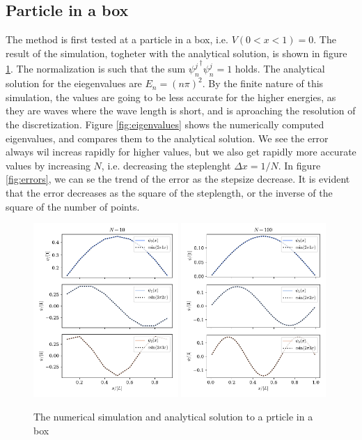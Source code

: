 \documentclass{article}
\begin{document}
\subsection*{Particle in a box}
    The method is first tested at a particle in a box, i.e. $V(0<x<1) = 0$. The result of the simulation, togheter with the analytical solution, is shown in figure \ref{fig:particel in box}. The normalization is such that the sum ${\psi_n^{j}}^\dagger\psi_n^{j} = 1$ holds. The analytical solution for the eiegenvalues are $E_n = (n \pi)^2$. By the finite nature of this simulation, the values are going to be less accurate for the higher energies, as they are waves where the wave length is short, and is aproaching the resolution of the discretization. Figure \ref{fig:eigenvalues} shows the numerically computed eigenvalues, and compares them to the analytical solution. We see the error always wil increas rapidly for higher values, but we also get rapidly more accurate values by increasing $N$, i.e. decreasing the steplenght $\Delta x = 1 / N$. In figure \ref{fig:errors}, we can se the trend of the error as the stepsize decrease. It is evident that the error decreases as the square of the steplength, or the inverse of the square of the number of points.

    \begin{figure}
        \centering
        \includegraphics[width=0.49\textwidth]{particle_in_box/vector_N=10}
        \includegraphics[width=0.49\textwidth]{particle_in_box/vector_N=100}
        \caption{The numerical simulation and analytical solution to a prticle in a box}
        \label{fig:particel in box}
    \end{figure}
\end{document}
